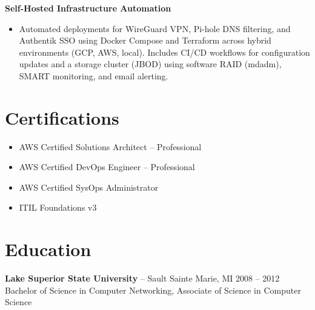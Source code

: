 \documentclass[11pt]{article}
\begin{document}
{\large\textbf{Self-Hosted Infrastructure Automation}} \\
\vspace{-9pt}
\begin{itemize}
  \item Automated deployments for WireGuard VPN, Pi-hole DNS filtering, and Authentik SSO using Docker Compose and Terraform across hybrid environments (GCP, AWS, local). Includes CI/CD workflows for configuration updates and a storage cluster (JBOD) using software RAID (mdadm), SMART monitoring, and email alerting.
\end{itemize}

\vspace{-18.5pt}

\section*{Certifications}
\begin{itemize}
    \item AWS Certified Solutions Architect -- Professional
    \item AWS Certified DevOps Engineer -- Professional
    \item AWS Certified SysOps Administrator
    \item ITIL Foundations v3
\end{itemize}

\vspace{-18.5pt}

\section*{Education}
{\large\textbf{Lake Superior State University}} -- Sault Sainte Marie, MI \hfill 2008 -- 2012 \\
Bachelor of Science in Computer Networking, Associate of Science in Computer Science
\end{document}
